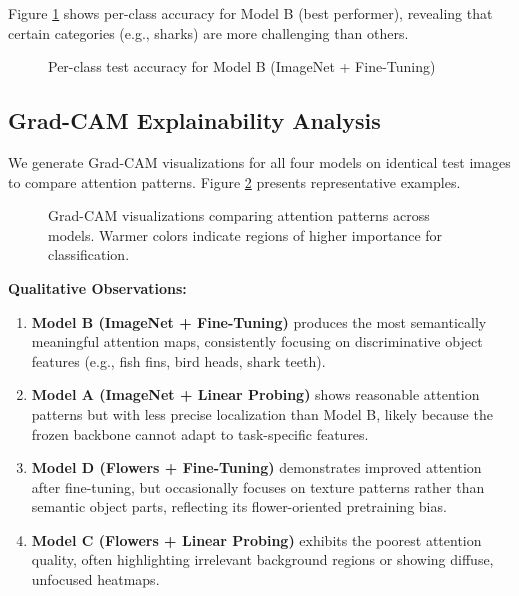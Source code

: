 \documentclass[11pt,a4paper]{article}
\begin{document}
Figure \ref{fig:per_class} shows per-class accuracy for Model B (best performer), revealing that certain categories (e.g., sharks) are more challenging than others.

\begin{figure}[H]
\centering
{}
\caption{Per-class test accuracy for Model B (ImageNet + Fine-Tuning)}
\label{fig:per_class}
\end{figure}

\subsection{Grad-CAM Explainability Analysis}

We generate Grad-CAM visualizations for all four models on identical test images to compare attention patterns. Figure \ref{fig:gradcam} presents representative examples.

\begin{figure}[H]
\centering
{}
\caption{Grad-CAM visualizations comparing attention patterns across models. Warmer colors indicate regions of higher importance for classification.}
\label{fig:gradcam}
\end{figure}

\textbf{Qualitative Observations:}

\begin{enumerate}
    \item \textbf{Model B (ImageNet + Fine-Tuning)} produces the most semantically meaningful attention maps, consistently focusing on discriminative object features (e.g., fish fins, bird heads, shark teeth).

    \item \textbf{Model A (ImageNet + Linear Probing)} shows reasonable attention patterns but with less precise localization than Model B, likely because the frozen backbone cannot adapt to task-specific features.

    \item \textbf{Model D (Flowers + Fine-Tuning)} demonstrates improved attention after fine-tuning, but occasionally focuses on texture patterns rather than semantic object parts, reflecting its flower-oriented pretraining bias.

    \item \textbf{Model C (Flowers + Linear Probing)} exhibits the poorest attention quality, often highlighting irrelevant background regions or showing diffuse, unfocused heatmaps.
\end{enumerate}
\end{document}
